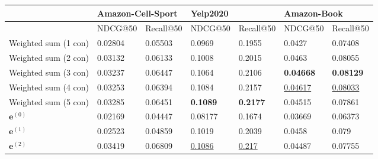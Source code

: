 \begin{table*}[]
    \centering
    \begin{tabular}{|l|l|l|l|l|l|l|}
        \hline
                             & \multicolumn{2}{l|}{Amazon-Cell-Sport} & \multicolumn{2}{l|}{Yelp2020} & \multicolumn{2}{l|}{Amazon-Book}                                                                 \\ \hline
                             & NDCG@50                                & Recall@50                     & NDCG@50                          & Recall@50         & NDCG@50             & Recall@50           \\ \hline
        Weighted sum (1 con) & 0.02804                                & 0.05503                       & 0.0969                           & 0.1955            & 0.0427              & 0.07408             \\ \hline
        Weighted sum (2 con) & 0.03132                                & 0.06133                       & 0.1008                           & 0.2015            & 0.0463              & 0.08055             \\ \hline
        Weighted sum (3 con) & 0.03237                                & 0.06447                       & 0.1064                           & 0.2106            & \textbf{0.04668}    & \textbf{0.08129}    \\ \hline
        Weighted sum (4 con) & 0.03253                                & 0.06394                       & 0.1084                           & 0.2157            & \underline{0.04617} & \underline{0.08033} \\ \hline
        Weighted sum (5 con) & 0.03285                                & 0.06451                       & \textbf{0.1089}                  & \textbf{0.2177}   & 0.04515             & 0.07861             \\ \hline
        $\mathbf{e}^{(0)}$   & 0.02169                                & 0.04447                       & 0.08177                          & 0.1674            & 0.03669             & 0.06373             \\ \hline
        $\mathbf{e}^{(1)}$   & 0.02523                                & 0.04859                       & 0.1019                           & 0.2039            & 0.0458              & 0.079               \\ \hline
        $\mathbf{e}^{(2)}$   & 0.03419                                & 0.06809                       & \underline{0.1086}               & \underline{0.217} & 0.04487             & 0.07755             \\ \hline

\end{tabular}
\end{table*}
